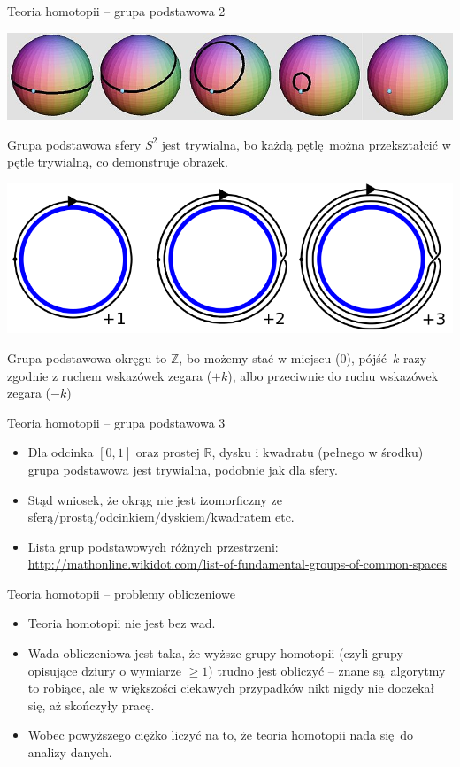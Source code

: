 \documentclass{beamer}
\begin{document}
\begin{frame}{Teoria homotopii -- grupa podstawowa 2}

\hspace*{-1.05cm}
\includegraphics[scale = 0.45]{P1S2.jpg}

Grupa podstawowa sfery $S^2$ jest trywialna, bo każdą pętlę można przekształcić w pętle trywialną, co demonstruje obrazek.

\hspace{1cm}
\includegraphics[scale = 0.3]{P1S1.png}

Grupa podstawowa okręgu to $\mathbb{Z}$, bo możemy stać w miejscu ($0$), pójść $k$ razy zgodnie z ruchem wskazówek zegara ($+k$), albo przeciwnie do ruchu wskazówek zegara ($-k$)

\end{frame}

\begin{frame}{Teoria homotopii -- grupa podstawowa 3}
\begin{itemize}
	\item Dla odcinka $[0, 1]$ oraz prostej $\mathbb{R}$, dysku i kwadratu (pełnego w środku) grupa podstawowa jest trywialna, podobnie jak dla sfery.
	\item Stąd wniosek, że okrąg nie jest izomorficzny ze sferą/prostą/odcinkiem/dyskiem/kwadratem etc.
	\item Lista grup podstawowych różnych przestrzeni: \url{http://mathonline.wikidot.com/list-of-fundamental-groups-of-common-spaces}
\end{itemize}
\end{frame}

\begin{frame}{Teoria homotopii -- problemy obliczeniowe}
\begin{itemize}
	\item Teoria homotopii nie jest bez wad.
	\item Wada obliczeniowa jest taka, że wyższe grupy homotopii (czyli grupy opisujące dziury o wymiarze $\geq 1$) trudno jest obliczyć -- znane są algorytmy to robiące, ale w większości ciekawych przypadków nikt nigdy nie doczekał się, aż skończyły pracę.
	\item Wobec powyższego ciężko liczyć na to, że teoria homotopii nada się do analizy danych.
\end{itemize}
\end{frame}
\end{document}
